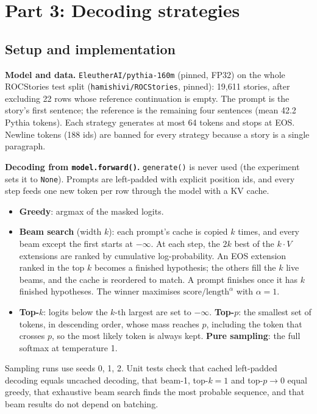 \documentclass[11pt,a4paper]{article}
\begin{document}
\section{Part 3: Decoding strategies}

\subsection{Setup and implementation}
\textbf{Model and data.} \texttt{EleutherAI/pythia-160m} (pinned, FP32) on the whole ROCStories test split (\texttt{hamishivi/ROCStories}, pinned): 19,611 stories, after excluding 22 rows whose reference continuation is empty. The prompt is the story's first sentence; the reference is the remaining four sentences (mean 42.2 Pythia tokens). Each strategy generates at most 64 tokens and stops at EOS. Newline tokens (188 ids) are banned for every strategy because a story is a single paragraph.

\textbf{Decoding from \texttt{model.forward()}.} \texttt{generate()} is never used (the experiment sets it to \texttt{None}). Prompts are left-padded with explicit position ids, and every step feeds one new token per row through the model with a KV cache.
\begin{itemize}
\item \textbf{Greedy}: argmax of the masked logits.
\item \textbf{Beam search} (width $k$): each prompt's cache is copied $k$ times, and every beam except the first starts at $-\infty$. At each step, the $2k$ best of the $k\cdot V$ extensions are ranked by cumulative log-probability. An EOS extension ranked in the top $k$ becomes a finished hypothesis; the others fill the $k$ live beams, and the cache is reordered to match. A prompt finishes once it has $k$ finished hypotheses. The winner maximises $\text{score}/\text{length}^{\alpha}$ with $\alpha=1$.
\item \textbf{Top-$k$}: logits below the $k$-th largest are set to $-\infty$. \textbf{Top-$p$}: the smallest set of tokens, in descending order, whose mass reaches $p$, including the token that crosses $p$, so the most likely token is always kept. \textbf{Pure sampling}: the full softmax at temperature 1.
\end{itemize}
Sampling runs use seeds 0, 1, 2. Unit tests check that cached left-padded decoding equals uncached decoding, that beam-1, top-$k{=}1$ and top-$p{\to}0$ equal greedy, that exhaustive beam search finds the most probable sequence, and that beam results do not depend on batching.
\end{document}
